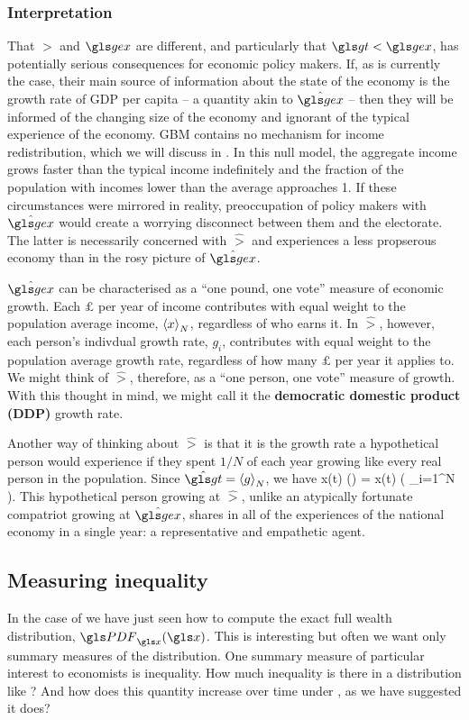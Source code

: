 \subsubsection{Interpretation}
That $\gt$ and $\gex$ are different, and particularly that $\gt<\gex$, has potentially serious consequences for economic policy makers. If, as is currently the case, their main source of information about the state of the economy is the growth rate of GDP per capita -- a quantity akin to $\hat{\gex}$ -- then they will be informed of the changing size of the economy and ignorant of the typical experience of the economy. GBM contains no mechanism for income redistribution, which we will discuss in . In this null model, the aggregate income grows faster than the typical income indefinitely and the fraction of the population with incomes lower than the average approaches 1. If these circumstances were mirrored in reality, preoccupation of policy makers with $\hat{\gex}$ would create a worrying disconnect between them and the electorate. The latter is necessarily concerned with $\hat{\gt}$ and experiences a less propserous economy than in the rosy picture of $\hat{\gex}$.

$\hat{\gex}$ can be characterised as a ``one pound, one vote'' measure of economic growth. Each $\pounds$ per year of income contributes with equal weight to the population average income, $\left\langle x\right\rangle_N$, regardless of who earns it. In $\hat{\gt}$, however, each person's indivdual growth rate, $g_i$, contributes with equal weight to the population average growth rate, regardless of how many $\pounds$ per year it applies to. We might think of $\hat{\gt}$, therefore, as a ``one person, one vote'' measure of growth. With this thought in mind, we might call it the \textbf{democratic domestic product (DDP)} growth rate.

Another way of thinking about $\hat{\gt}$ is that it is the growth rate a hypothetical person would experience if they spent $1/N$ of each year growing like every real person in the population. Since $\hat{\gt}=\ave{g}_N$, we have
\be
x(t) \exp(\hat{\gt}\Dt) = x(t) \exp \left( \sum_{i=1}^N  \right).
\ee
This hypothetical person growing at $\hat{\gt}$, unlike an atypically fortunate compatriot growing at $\hat{\gex}$, shares in all of the experiences of the national economy in a single year: a representative and empathetic agent.


\subsection{Measuring inequality}
In the case of \GBM we have just seen how to 
compute the exact full wealth distribution, $\PDF_\x(\x)$. This is interesting but often we want only summary measures of the distribution. One summary measure of particular interest to economists is inequality. How much inequality is there in a distribution like ? And how does this quantity increase over time under \GBM, as we have suggested it does?


